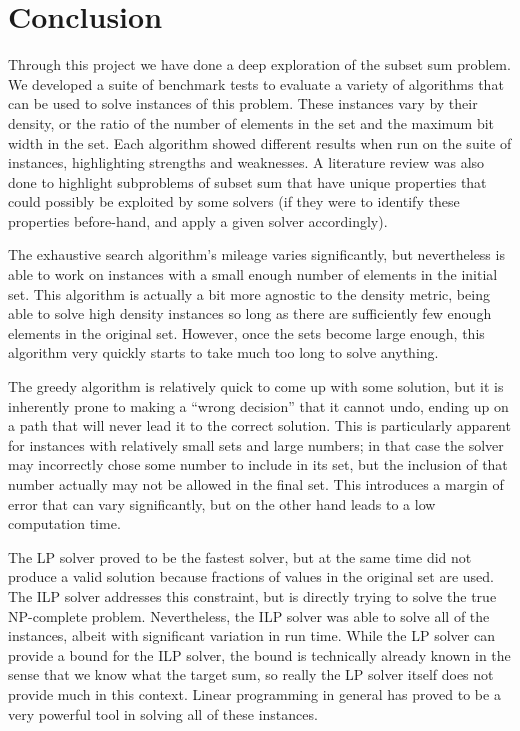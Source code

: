 \documentclass{report}
\begin{document}
\chapter{Conclusion}
Through this project we have done a deep exploration of the subset sum problem. We developed a suite of benchmark tests to evaluate
a variety of algorithms that can be used to solve instances of this problem. These instances vary by their density, or the ratio of
the number of elements in the set and the maximum bit width in the set. Each algorithm showed different results when run on the suite
of instances, highlighting strengths and weaknesses. A literature review was also done to highlight subproblems of subset sum that have
unique properties that could possibly be exploited by some solvers (if they were to identify these properties before-hand, and
apply a given solver accordingly).

The exhaustive search algorithm's mileage varies significantly, but nevertheless is able to work on instances with a small enough number
of elements in the initial set.
This algorithm is actually a bit more agnostic to the density metric, being able to solve high density instances so long as
there are sufficiently few enough elements in the original set. However, once the sets become large enough, this algorithm very quickly
starts to take much too long to solve anything. 

The greedy algorithm is relatively quick to come up with some solution, but it is inherently prone to making a ``wrong decision''
that it cannot undo, ending up on a path that will never lead it to the correct solution.
This is particularly apparent for instances with relatively small
sets and large numbers; in that case the solver may incorrectly chose some number to include in its set, but the inclusion of that number
actually may not be allowed in the final set. This introduces a margin of error that can vary significantly, but on the other hand
leads to a low computation time.

The LP solver proved to be the fastest solver, but at the same time did not produce a valid solution because fractions of values
in the original set are used. The ILP solver addresses this constraint, but is directly trying to solve the true NP-complete problem. Nevertheless,
the ILP solver was able to solve all of the instances, albeit with significant variation in run time. While the LP solver can provide
a bound for the ILP solver, the bound is technically already known in the sense that we know what the target sum, so really the LP solver itself
does not provide much in this context. Linear programming in general has proved to be a very powerful tool in solving all of these instances.
\end{document}
